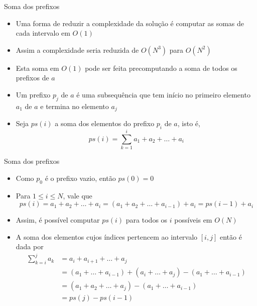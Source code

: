 \begin{frame}[fragile]{Soma dos prefixos}

    \begin{itemize}
        \item Uma forma de reduzir a complexidade da solução é computar as somas de cada
            intervalo em $O(1)$

        \item Assim a complexidade seria reduzida de $O(N^3)$ para $O(N^2)$

        \item Esta soma em $O(1)$ pode ser feita precomputando a soma de todos os prefixos
            de $a$

        \item Um prefixo $p_j$ de $a$ é uma subsequência que tem início no primeiro elemento $a_1$
            de $a$ e termina no elemento $a_j$

        \item Seja $ps(i)$ a soma dos elementos do prefixo $p_i$ de $a$, isto é,
        \[
            ps(i) = \sum_{k = 1}^i a_1 + a_2 + \ldots + a_i
        \]

    \end{itemize}

\end{frame}

\begin{frame}[fragile]{Soma dos prefixos}

    \begin{itemize}
        \item Como $p_0$ é o prefixo vazio, então $ps(0) = 0$

        \item Para $1\leq i\leq N$, vale que
        \[
            ps(i) = a_1 + a_2 + \ldots + a_i = (a_1 + a_2 + \ldots + a_{i - 1}) + a_i =
                ps(i - 1) + a_i
        \]

        \item Assim, é possível computar $ps(i)$ para todos os $i$ possíveis em $O(N)$

        \item A soma dos elementos cujos índices pertencem ao intervalo $[i, j]$ então é dada
            por
        \begin{align*}
            \sum_{k = i}^j a_k &= a_i + a_{i + 1} + \ldots + a_j \\
                &= (a_1 + \ldots + a_{i - 1}) + (a_i + \ldots + a_j) - (a_1 + \ldots + a_{i - 1}) \\
                &= (a_1 + a_2 + \ldots + a_j) - (a_1 + \ldots + a_{i - 1}) \\
                &= ps(j) - ps(i - 1)
        \end{align*}

    \end{itemize}

\end{frame}

